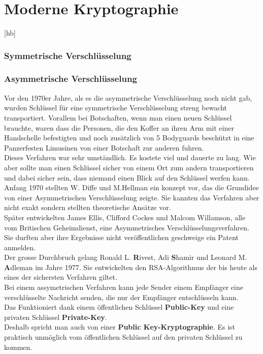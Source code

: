 \section{Moderne Kryptographie}[hb]

\subsubsection{Symmetrische Verschlüsselung}
\subsubsection{Asymmetrische Verschlüsselung}
Vor den 1970er Jahre, als es die asymmetrische Verschlüsselung noch nicht gab, wurden Schlüssel für eine symmetrische Verschlüsselung streng bewacht transportiert.
Vorallem bei Botschaften, wenn man einen neuen Schlüssel brauchte, waren dass die Personen, die den Koffer an ihren Arm mit einer Handschelle befestigten und noch zusätzlich von 5 Bodyguards beschützt in eine Panzerfesten Limusinen von einer Botschaft zur anderen fuhren.\\
Dieses Verfahren war sehr umständlich. Es kostete viel und dauerte zu lang. Wie aber sollte man einen Schlüssel sicher von einem Ort zum andern transportieren und dabei sicher sein, dass niemand einen Blick auf den Schlüssel werfen kann.\\
Anfang 1970 stellten W. Diffe und M.Hellman ein konzept vor, das die Grundidee von einer Asymmetrischen Verschlüsselung zeigte. Sie kannten das Verfahren aber nicht exakt sondern stellten theoretische Ansätze vor.
\\
Später entwickelten James Ellis, Clifford Cockes und Malcom Willamson, alle vom Britischen Geheimdienst,  eine Asymmetrisches Verschlüsselungsverfahren. Sie durften aber ihre Ergebnisse nicht veröffentlichen geschweige ein Patent anmelden.\\
 Der grosse Durchbruch gelang Ronald L. \textbf{R}ivest, Adi \textbf{S}hamir und Leonard M. \textbf{A}dleman im Jahre 1977. Sie entwickelten den RSA-Algorithmus der bis heute als eines der sichersten Verfahren giltet.\\[2ex]
Bei einem assymetrischen Verfahren kann jede Sender einem Empfänger eine verschlüsselte Nachricht senden, die nur der Empfänger entschlüsseln kann.\\
%
Das Funktioniert dank einem öffentlichen Schlüssel \textbf{Public-Key} und eine privaten Schlüssel \textbf{Private-Key}. \\
Deshalb spricht man auch von einer  \textbf{Public Key-Kryptographie}. Es ist praktisch unmöglich vom öffentlichen Schlüssel auf den privaten Schlüssel zu kommen.
%
